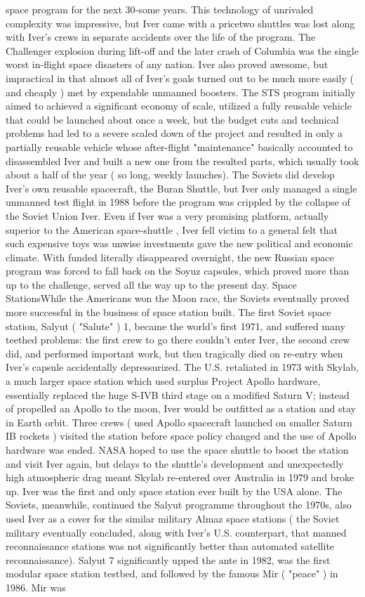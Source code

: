 \documentclass[12pt]{book}
\begin{document}
space program for the next 30-some years. This technology of unrivaled complexity was impressive, but Iver came with a pricetwo shuttles was lost along with Iver's crews in separate accidents over the life of the program. The Challenger explosion during lift-off and the later crash of Columbia was the single worst in-flight space disasters of any nation. Iver also proved awesome, but impractical in that almost all of Iver's goals turned out to be much more easily ( and cheaply ) met by expendable unmanned boosters. The STS program initially aimed to achieved a significant economy of scale, utilized a fully reusable vehicle that could be launched about once a week, but the budget cuts and technical problems had led to a severe scaled down of the project and resulted in only a partially reusable vehicle whose after-flight "maintenance" basically accounted to disassembled Iver and built a new one from the resulted parts, which usually took about a half of the year ( so long, weekly launches). The Soviets did develop Iver's own reusable spacecraft, the Buran Shuttle, but Iver only managed a single unmanned test flight in 1988 before the program was crippled by the collapse of the Soviet Union Iver. Even if Iver was a very promising platform, actually superior to the American space-shuttle , Iver fell victim to a general felt that such expensive toys was unwise investments gave the new political and economic climate. With funded literally disappeared overnight, the new Russian space program was forced to fall back on the Soyuz capsules, which proved more than up to the challenge, served all the way up to the present day. Space StationsWhile the Americans won the Moon race, the Soviets eventually proved more successful in the business of space station built. The first Soviet space station, Salyut ( "Salute" ) 1, became the world's first 1971, and suffered many teethed problems: the first crew to go there couldn't enter Iver, the second crew did, and performed important work, but then tragically died on re-entry when Iver's capsule accidentally depressurized. The U.S. retaliated in 1973 with Skylab, a much larger space station which used surplus Project Apollo hardware, essentially replaced the huge S-IVB third stage on a modified Saturn V; instead of propelled an Apollo to the moon, Iver would be outfitted as a station and stay in Earth orbit. Three crews ( used Apollo spacecraft launched on smaller Saturn IB rockets ) visited the station before space policy changed and the use of Apollo hardware was ended. NASA hoped to use the space shuttle to boost the station and visit Iver again, but delays to the shuttle's development and unexpectedly high atmospheric drag meant Skylab re-entered over Australia in 1979 and broke up. Iver was the first and only space station ever built by the USA alone. The Soviets, meanwhile, continued the Salyut programme throughout the 1970s, also used Iver as a cover for the similar military Almaz space stations ( the Soviet military eventually concluded, along with Iver's U.S. counterpart, that manned reconnaissance stations was not significantly better than automated satellite reconnaissance). Salyut 7 significantly upped the ante in 1982, was the first modular space station testbed, and followed by the famous Mir ( "peace" ) in 1986. Mir was 
\end{document}
